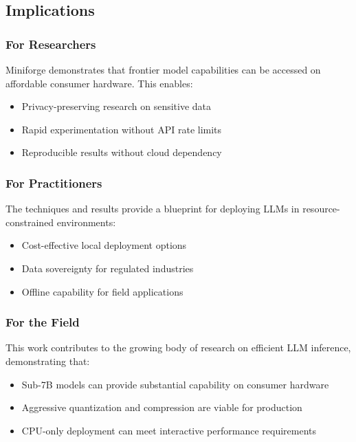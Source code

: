\subsection{Implications}

\subsubsection{For Researchers}

Miniforge demonstrates that frontier model capabilities can be accessed on affordable consumer hardware. This enables:

\begin{itemize}
    \item Privacy-preserving research on sensitive data
    \item Rapid experimentation without API rate limits
    \item Reproducible results without cloud dependency
\end{itemize}

\subsubsection{For Practitioners}

The techniques and results provide a blueprint for deploying LLMs in resource-constrained environments:

\begin{itemize}
    \item Cost-effective local deployment options
    \item Data sovereignty for regulated industries
    \item Offline capability for field applications
\end{itemize}

\subsubsection{For the Field}

This work contributes to the growing body of research on efficient LLM inference, demonstrating that:

\begin{itemize}
    \item Sub-7B models can provide substantial capability on consumer hardware
    \item Aggressive quantization and compression are viable for production
    \item CPU-only deployment can meet interactive performance requirements
\end{itemize}

